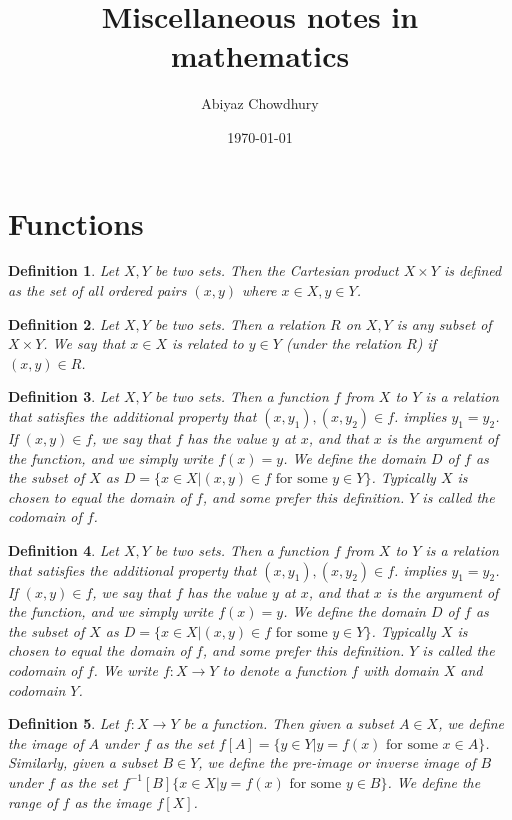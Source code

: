 \documentclass[a4paper]{article}
\title{\textbf{Miscellaneous notes in mathematics}}
\author{Abiyaz Chowdhury }
\date{\today}
\newtheorem{mydef}{Definition}
\numberwithin{mytheorem}{section}
\numberwithin{mydef}{section}
\numberwithin{example}{section}
\begin{document}
\maketitle

\section{Functions}

\begin{mydef} Let $X,Y$ be two sets. Then the Cartesian product  $X \times Y$ is defined as the set of all ordered pairs $(x,y)$ where $x \in X, y \in Y$. 
\end{mydef}

\begin{mydef} Let $X,Y$ be two sets. Then a relation $R$ on $X,Y$ is any subset of $X \times Y$. We say that $x \in X$ is related to $y \in Y$ (under the relation $R$) if $(x,y) \in R$. 
\end{mydef}

\begin{mydef} Let $X,Y$ be two sets. Then a function $f$ from $X$ to $Y$ is a relation that satisfies the additional property that  $(x,y_{1}),(x,y_{2}) \in f$. implies $y_{1} = y_{2}$. If $(x,y) \in f$, we say that $f$ has the value $y$ at $x$, and that $x$ is the argument of the function, and we simply write $f(x) = y$. We define the domain $D$ of $f$ as the subset of $X$ as $D = \{ x \in X | (x,y) \in f \text{ for some } y \in Y \}$. Typically $X$ is chosen to equal the domain of $f$, and some prefer this definition. $Y$ is called the codomain of $f$. 
\end{mydef}

\begin{mydef} Let $X,Y$ be two sets. Then a function $f$ from $X$ to $Y$ is a relation that satisfies the additional property that  $(x,y_{1}),(x,y_{2}) \in f$. implies $y_{1} = y_{2}$. If $(x,y) \in f$, we say that $f$ has the value $y$ at $x$, and that $x$ is the argument of the function, and we simply write $f(x) = y$. We define the domain $D$ of $f$ as the subset of $X$ as $D = \{ x \in X | (x,y) \in f \text{ for some } y \in Y \}$. Typically $X$ is chosen to equal the domain of $f$, and some prefer this definition. $Y$ is called the codomain of $f$. We write $f : X \rightarrow Y$ to denote a function $f$ with domain $X$ and codomain $Y$. 
\end{mydef}

\begin{mydef} Let $f : X \rightarrow Y$ be a function. Then given a subset $A \in X$, we define the image of $A$ under $f$ as the set $f[A] = \{ y \in Y | y = f(x) \text{ for some } x \in A \}$. Similarly, given a subset $B \in Y$, we define the pre-image or inverse image of $B$ under $f$ as the set $f^{-1}[B] \{ x \in X | y = f(x) \text{ for some } y \in B \}$. We define the range of $f$ as the image $f[X]$. 
\end{mydef}
\end{document}
